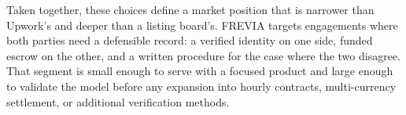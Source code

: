Taken together, these choices define a market position that is narrower than Upwork's and deeper than a listing board's. FREVIA targets engagements where both parties need a defensible record: a verified identity on one side, funded escrow on the other, and a written procedure for the case where the two disagree. That segment is small enough to serve with a focused product and large enough to validate the model before any expansion into hourly contracts, multi-currency settlement, or additional verification methods.
